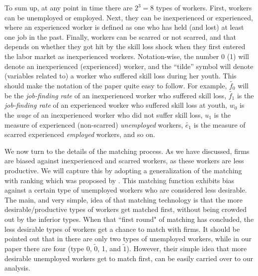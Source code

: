 \documentclass[12pt]{article} %
\theoremstyle{definition}
\begin{document}
To sum up, at any point in time there are $2^3=8$ types of workers. First, workers can be unemployed or employed. Next, they can be inexperienced or experienced, where an experienced worker is defined as one who has held (and lost) at least one job in the past. Finally, workers can be scarred or not scarred, and that depends on whether they got hit by the skill loss shock when they first entered the labor market as inexperienced workers. Notation-wise, the number 0 (1) will denote an inexperienced (experienced) worker, and the ``tilde'' symbol will denote (variables related to) a worker who suffered skill loss during her youth. This should make the notation of the paper quite easy to follow. For example, $\tilde{f_0}$ will be the \textit{job-finding rate} of an inexperienced worker who suffered skill loss, $\tilde{f_1}$ is the  \textit{job-finding rate} of an experienced worker who suffered skill loss at youth, $w_0$ is the  \textit{wage} of an inexperienced worker who did not suffer skill loss, $u_1$ is the measure of experienced (non-scarred)  \textit{unemployed} workers, $\tilde{e_1}$ is the measure of scarred experienced  \textit{employed} workers, and so on.


We now turn to the details of the matching process. As we have discussed, firms are biased against inexperienced and scarred workers, as these workers are less productive. We will capture this by adopting a generalization of the \cite{blanchard1994ranking} matching with ranking which was proposed by \cite{petrongolo2001looking}. This matching function exhibits bias against a certain type of unemployed workers who are considered less desirable. The main, and very simple, idea of that matching technology is that the more desirable/productive types of workers get matched first, without being crowded out by the inferior types. When that ``first round" of matching has concluded, the less desirable types of workers get a chance to match with firms. It should be pointed out that in \cite{petrongolo2001looking} there are only two types of unemployed workers, while in our paper there are four (type 0, $\tilde{0}$, 1, and $\tilde{1}$). However, their simple idea that more desirable unemployed workers get to match first, can be easily carried over to our analysis. 


\end{document}
